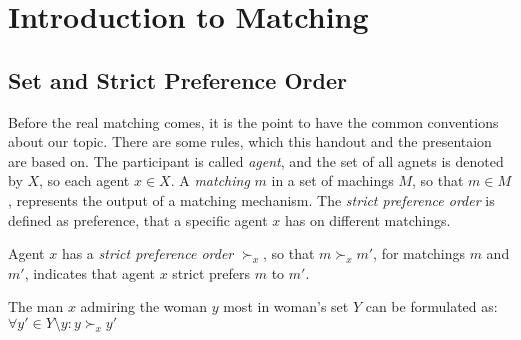 
\chapter{Introduction to Matching}
\section{Set and Strict Preference Order}
Before the real matching comes, it is the point to have the common conventions about our topic. There are some rules, which this handout and the presentaion are based on.
The participant is called \emph{agent}, and the set of all agnets is denoted by $X$, so each agent $x \in X$. A \emph{matching} $m$ in a set of machings $M$, so that $m \in M$, represents the output of a matching mechanism.
The \emph{strict preference order} is defined as preference, that a specific agent $x$ has on different matchings. 
\vspace{-\baselineskip}
\begin{description}[leftmargin=1em+5mm, labelindent=5mm]
    \item[Strict Preference - Definition]  Agent $x$ has a \emph{strict preference order} $\succ_x$, so that $m \succ_x m'$, for matchings $m$ and $m'$, indicates that agent $x$ strict prefers $m$ to $m'$. 
\end{description}
\begin{exmp}
The man $x$ admiring the woman $y$ most in woman's set $Y$ can be formulated as: $\forall y' \in Y\setminus{y} : y \succ_x y'$ \\
\end{exmp}

